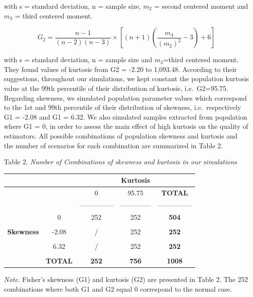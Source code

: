 \documentclass[
  man,floatsintext]{apa6}
\begin{document}
with s = standard deviation, n = sample size, \(m_{2}\) = second centered moment and \(m_{3}\) = third centered moment.

\begin{equation} 
G_{2}=\frac{n-1}{(n-2)(n-3)}\times [(n+1)(\frac{m_{4}}{(m_{2})^2}-3)+6]
\label{eq:kurt}
\end{equation}

with s = standard deviation, n = sample size and \(m_{3}\)=third centered moment. They found values of kurtosis from G2 = -2.20 to 1,093.48. According to their suggestions, throughout our simulations, we kept constant the population kurtosis value at the 99th percentile of their distribution of kurtosis, i.e.~G2=95.75. Regarding skewness, we simulated population parameter values which correspond to the 1st and 99th percentile of their distribution of skewness, i.e.~respectively G1 = -2.08 and G1 = 6.32. We also simulated samples extracted from population where G1 = 0, in order to assess the main effect of high kurtosis on the quality of estimators. All possible combinations of population skewness and kurtosis and the number of scenarios for each combination are summarized in Table 2.

Table 2.
\emph{Number of Combinations of skewness and kurtosis in our simulations}

\begin{longtable}[]{@{}ccccc@{}}
\toprule
& & & \textbf{Kurtosis} &\tabularnewline
\midrule
\endhead
& & 0 & 95.75 & \textbf{TOTAL}\tabularnewline
& & --------------- & -------------- & ---------------\tabularnewline
& 0 & 252 & 252 & \textbf{504}\tabularnewline
& & & &\tabularnewline
\textbf{Skewness} & -2.08 & / & 252 & \textbf{252}\tabularnewline
& & & &\tabularnewline
& 6.32 & / & 252 & \textbf{252}\tabularnewline
& & & &\tabularnewline
& \textbf{TOTAL} & \textbf{252} & \textbf{756} & \textbf{1008}\tabularnewline
\bottomrule
\end{longtable}

\emph{Note.} Fisher's skewness (G1) and kurtosis (G2) are presented in Table 2. The 252 combinations where both G1 and G2 equal 0 correspond to the normal case.
\end{document}
